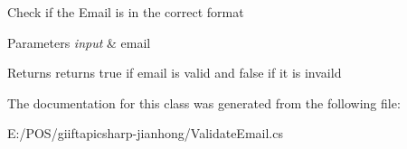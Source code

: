 Check if the Email is in the correct format 


\begin{DoxyParams}{Parameters}
{\em input} & email\\
\hline
\end{DoxyParams}
\begin{DoxyReturn}{Returns}
returns true if email is valid and false if it is invaild
\end{DoxyReturn}


The documentation for this class was generated from the following file\+:\begin{DoxyCompactItemize}
\item 
E\+:/\+P\+O\+S/giiftapicsharp-\/jianhong/Validate\+Email.\+cs\end{DoxyCompactItemize}
